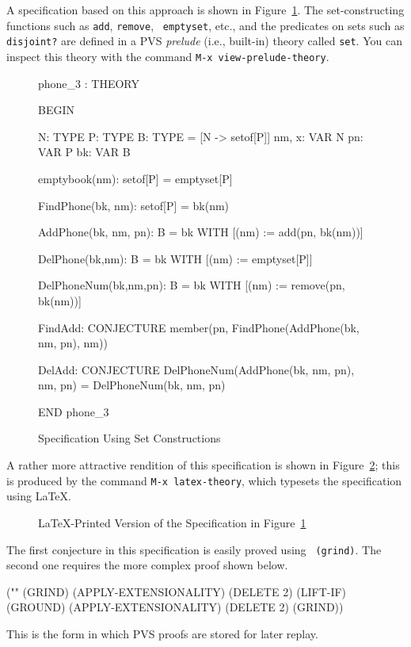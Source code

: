 A specification based on this approach is shown in Figure~\ref{fig3}.
The set-constructing functions such as {\tt add}, {\tt remove}, {\tt
emptyset}, etc., and the predicates on sets such as {\tt disjoint?}
are defined in a PVS {\em prelude\/} (i.e., built-in)
theory called {\tt set}.  You can inspect this theory with the command
{\tt M-x view-prelude-theory}.
\begin{figure}[htbp]
\begin{pvsexample}
phone_3 : THEORY

  BEGIN

  N: TYPE                     %
  P: TYPE                     %
  B: TYPE = [N -> setof[P]]   %
  nm, x: VAR N
  pn: VAR P
  bk: VAR B
  
  emptybook(nm): setof[P] = emptyset[P]

  FindPhone(bk, nm): setof[P] = bk(nm)

  AddPhone(bk, nm, pn): B = bk WITH [(nm) := add(pn, bk(nm))]

  DelPhone(bk,nm): B = bk WITH [(nm) := emptyset[P]]

  DelPhoneNum(bk,nm,pn): B = bk WITH [(nm) := remove(pn, bk(nm))]

  FindAdd: CONJECTURE member(pn, FindPhone(AddPhone(bk, nm, pn), nm))

  DelAdd: CONJECTURE DelPhoneNum(AddPhone(bk, nm, pn), nm, pn) =
                DelPhoneNum(bk, nm, pn)

  END phone_3
\end{pvsexample}
\caption{\label{fig3}Specification Using Set Constructions}
\end{figure}
A rather more attractive rendition of this specification is shown in
Figure~\ref{fig3-latex}; this is produced by the command {\tt M-x
latex-theory}, which typesets the specification using \LaTeX.

\begin{figure}
\def\pvsdeclspacing{-2mm}

\caption{\label{fig3-latex}\LaTeX-Printed Version of the Specification
in Figure~\protect\ref{fig3}}
\end{figure}
The first conjecture in this specification is easily proved using {\tt
(grind)}.   The second one requires the more complex proof shown
below.
\begin{pvsexample}
("" (GRIND)
    (APPLY-EXTENSIONALITY)
    (DELETE 2)
    (LIFT-IF)
    (GROUND)
    (APPLY-EXTENSIONALITY)
    (DELETE 2)
    (GRIND))
\end{pvsexample}
This is the form in which PVS proofs are stored for later replay.

